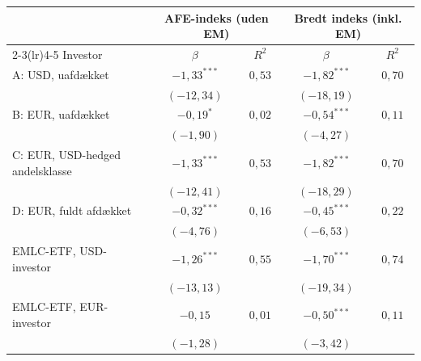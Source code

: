 \begin{tabular}{lcccc}
\toprule
 & \multicolumn{2}{c}{AFE-indeks (uden EM)} & \multicolumn{2}{c}{Bredt indeks (inkl. EM)} \\
\cmidrule(lr){2-3}\cmidrule(lr){4-5}
Investor & $\beta$ & $R^2$ & $\beta$ & $R^2$ \\
\midrule
A: USD, uafdækket & $-1{,}33^{***}$ & $0{,}53$ & $-1{,}82^{***}$ & $0{,}70$ \\
 & $(-12{,}34)$ & & $(-18{,}19)$ & \\
B: EUR, uafdækket & $-0{,}19^{*}$ & $0{,}02$ & $-0{,}54^{***}$ & $0{,}11$ \\
 & $(-1{,}90)$ & & $(-4{,}27)$ & \\
C: EUR, USD-hedged andelsklasse & $-1{,}33^{***}$ & $0{,}53$ & $-1{,}82^{***}$ & $0{,}70$ \\
 & $(-12{,}41)$ & & $(-18{,}29)$ & \\
D: EUR, fuldt afdækket & $-0{,}32^{***}$ & $0{,}16$ & $-0{,}45^{***}$ & $0{,}22$ \\
 & $(-4{,}76)$ & & $(-6{,}53)$ & \\
\midrule
EMLC-ETF, USD-investor & $-1{,}26^{***}$ & $0{,}55$ & $-1{,}70^{***}$ & $0{,}74$ \\
 & $(-13{,}13)$ & & $(-19{,}34)$ & \\
EMLC-ETF, EUR-investor & $-0{,}15$ & $0{,}01$ & $-0{,}50^{***}$ & $0{,}11$ \\
 & $(-1{,}28)$ & & $(-3{,}42)$ & \\
\bottomrule
\end{tabular}
